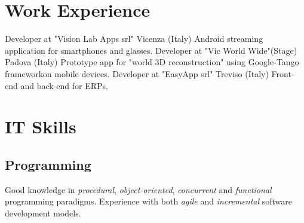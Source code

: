 \documentclass[letterpaper]{twentysecondcv} %
\begin{document}


\section{Work Experience}

\begin{twenty} %
		{Developer at "Vision Lab Apps srl"\footnotemarkA[4]}	{Vicenza (Italy)}
		{Android streaming application for smartphones and glasses.}
		{Developer at "Vic World Wide"\footnotemarkA[5] (Stage)}	{Padova (Italy)}
		{Prototype app for "world 3D reconstruction" using Google-Tango framework\footnotemarkA[6] on mobile devices.}
		{Developer at "EasyApp srl"\footnotemarkA[7]}	{Treviso (Italy)}
		{Front-end and back-end  for ERPs.}
\end{twenty}




\section{IT Skills}

\subsection{Programming}

Good knowledge in \textit{procedural}, \textit{object-oriented}, \textit{concurrent} and \textit{functional} programming paradigms.
Experience with both \textit{agile} and \textit{incremental} software development models.
\end{document}
